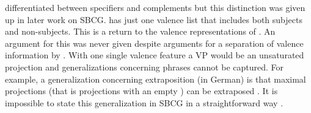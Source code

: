 \documentclass[output=paper]{langsci/langscibook}
\begin{document}
\citet{SWB2003a} differentiated between specifiers and complements but this distinction was given up
in later work on SBCG. \citet{Sag2012a} has just one valence list that includes both subjects and
non-subjects. This is a return to the valence representations of \citet{ps}. An argument for this
was never given despite arguments for a separation of valence information by \citet{Borsley87a}. With one single valence feature a VP would be an unsaturated projection and generalizations
concerning phrases cannot be captured. For example, a generalization concerning extraposition (in
German) is that maximal projections (that is projections with an empty \compsl) can be
extraposed \citep[Section~13.1.2]{Mueller99a}. It is impossible to state this generalization in SBCG
in a straightforward way \citep[Section~10.6.2.3]{MuellerGT-Eng2}.

\end{document}
